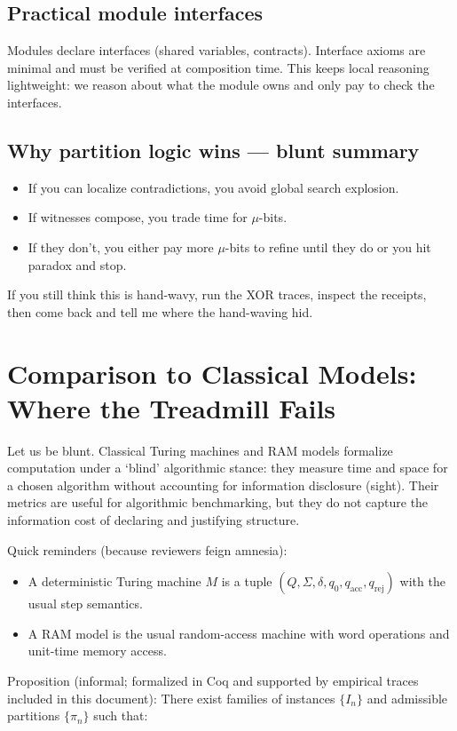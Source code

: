 \documentclass[11pt]{article}
\begin{document}
\subsection{Practical module interfaces}
Modules declare interfaces (shared variables, contracts). Interface axioms are minimal and must be verified at composition time. This keeps local reasoning lightweight: we reason about what the module owns and only pay to check the interfaces.

\subsection{Why partition logic wins — blunt summary}
\begin{itemize}
  \item If you can localize contradictions, you avoid global search explosion.
  \item If witnesses compose, you trade time for $\mu$-bits.
  \item If they don't, you either pay more $\mu$-bits to refine until they do or you hit paradox and stop.
\end{itemize}

If you still think this is hand-wavy, run the XOR traces, inspect the receipts, then come back and tell me where the hand-waving hid.

\section{Comparison to Classical Models: Where the Treadmill Fails}
Let us be blunt. Classical Turing machines and RAM models formalize computation under a `blind' algorithmic stance: they measure time and space for a chosen algorithm without accounting for information disclosure (sight). Their metrics are useful for algorithmic benchmarking, but they do not capture the information cost of declaring and justifying structure.

Quick reminders (because reviewers feign amnesia):
\begin{itemize}
  \item A deterministic Turing machine $M$ is a tuple $(Q,\Sigma,\delta,q_0,q_{\text{acc}},q_{\text{rej}})$ with the usual step semantics.
  \item A RAM model is the usual random-access machine with word operations and unit-time memory access.
\end{itemize}

Proposition (informal; formalized in Coq and supported by empirical traces included in this document):
There exist families of instances $\{I_n\}$ and admissible partitions $\{\pi_n\}$ such that:
\end{document}
